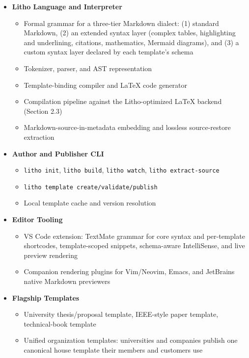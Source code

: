 \documentclass[a4paper,twoside]{article}
\begin{document}
\begin{itemize}[leftmargin=*]
  \item \textbf{Litho Language and Interpreter}
    \begin{itemize}
      \item Formal grammar for a three-tier Markdown dialect: (1) standard Markdown, (2) an extended syntax layer (complex tables, highlighting and underlining, citations, mathematics, Mermaid diagrams), and (3) a custom syntax layer declared by each template's schema
      \item Tokenizer, parser, and AST representation
      \item Template-binding compiler and LaTeX code generator
      \item Compilation pipeline against the Litho-optimized LaTeX backend (Section 2.3)
      \item Markdown-source-in-metadata embedding and lossless source-restore extraction
    \end{itemize}

  \item \textbf{Author and Publisher CLI}
    \begin{itemize}
      \item \texttt{litho init}, \texttt{litho build}, \texttt{litho watch}, \texttt{litho extract-source}
      \item \texttt{litho template create/validate/publish}
      \item Local template cache and version resolution
    \end{itemize}

  \item \textbf{Editor Tooling}
    \begin{itemize}
      \item VS Code extension: TextMate grammar for core syntax and per-template shortcodes, template-scoped snippets, schema-aware IntelliSense, and live preview rendering
      \item Companion rendering plugins for Vim/Neovim, Emacs, and JetBrains native Markdown previewers
    \end{itemize}

  \item \textbf{Flagship Templates}
    \begin{itemize}
      \item University thesis/proposal template, IEEE-style paper template, technical-book template
      \item Unified organization templates: universities and companies publish one canonical house template their members and customers use
    \end{itemize}


\end{itemize}
\end{document}
